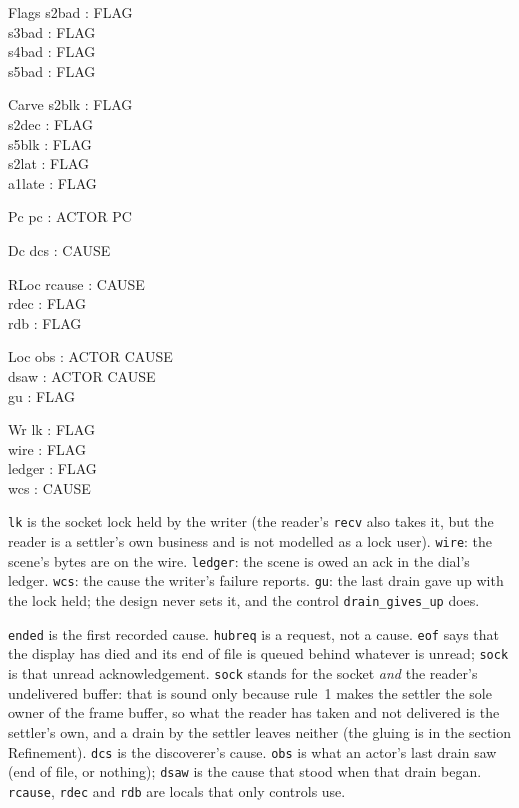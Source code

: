\documentclass[a4paper,10pt,fleqn]{article}
\begin{document}
\begin{schema}{Flags}
  s2bad : FLAG \\
  s3bad : FLAG \\
  s4bad : FLAG \\
  s5bad : FLAG
\end{schema}

\begin{schema}{Carve}
  s2blk : FLAG \\
  s2dec : FLAG \\
  s5blk : FLAG \\
  s2lat : FLAG \\
  a1late : FLAG
\end{schema}

\begin{schema}{Pc}
  pc : ACTOR \fun PC
\end{schema}

\begin{schema}{Dc}
  dcs : CAUSE
\end{schema}

\begin{schema}{RLoc}
  rcause : CAUSE \\
  rdec : FLAG \\
  rdb : FLAG
\end{schema}

\begin{schema}{Loc}
  obs : ACTOR \fun CAUSE \\
  dsaw : ACTOR \fun CAUSE \\
  gu : FLAG
\end{schema}

\begin{schema}{Wr}
  lk : FLAG \\
  wire : FLAG \\
  ledger : FLAG \\
  wcs : CAUSE
\end{schema}

\texttt{lk} is the socket lock held by the writer (the reader's \texttt{recv}
also takes it, but the reader is a settler's own business and is not modelled as
a lock user).  \texttt{wire}: the scene's bytes are on the wire.  \texttt{ledger}:
the scene is owed an ack in the dial's ledger.  \texttt{wcs}: the cause the
writer's failure reports.  \texttt{gu}: the last drain gave up with the lock held;
the design never sets it, and the control \texttt{drain\_gives\_up} does.

\texttt{ended} is the first recorded cause.  \texttt{hubreq} is a request, not a
cause.  \texttt{eof} says that the display has died and its end of file is
queued behind whatever is unread; \texttt{sock} is that unread
acknowledgement.  \texttt{sock} stands for the socket \emph{and} the reader's
undelivered buffer: that is sound only because rule~1 makes the settler the sole
owner of the frame buffer, so what the reader has taken and not delivered is the
settler's own, and a drain by the settler leaves neither (the gluing is in the
section Refinement).  \texttt{dcs} is the discoverer's cause.  \texttt{obs} is
what an actor's last drain saw (end of file, or nothing); \texttt{dsaw} is the
cause that stood when that drain began.  \texttt{rcause}, \texttt{rdec} and
\texttt{rdb} are locals that only controls use.
\end{document}
